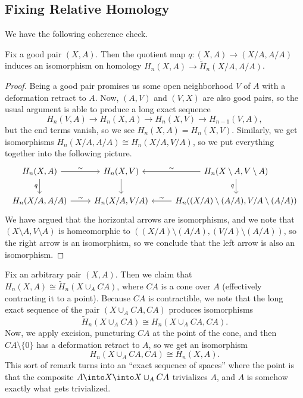 \documentclass[../notes.tex]{subfiles}
\begin{document}
\subsection{Fixing Relative Homology}
We have the following coherence check.
\begin{proposition}
	Fix a good pair $(X,A)$. Then the quotient map $q\colon(X,A)\to (X/A,A/A)$ induces an isomorphism on homology $H_n(X,A)\to\widetilde H_n(X/A,A/A)$.
\end{proposition}
\begin{proof}
	Being a good pair promises us some open neighborhood $V$ of $A$ with a deformation retract to $A$. Now, $(A,V)$ and $(V,X)$ are also good pairs, so the usual argument is able to produce a long exact sequence
	\[H_n(V,A)\to H_n(X,A)\to H_n(X,V)\to H_{n-1}(V,A),\]
	but the end terms vanish, so we see $H_n(X,A)=H_n(X,V)$. Similarly, we get isomorphisms $H_n(X/A,A/A)\cong H_n(X/A,V/A)$, so we put everything together into the following picture.
	\[\begin{tikzcd}
		{H_n(X,A)} & {H_n(X,V)} & {H_n(X\setminus A,V\setminus A)} \\
		{H_n(X/A,A/A)} & {H_n(X/A,V/A)} & {H_n((X/A)\setminus (A/A),V/A\setminus (A/A))}
		\arrow["\sim", from=1-1, to=1-2]
		\arrow["\sim", from=2-1, to=2-2]
		\arrow["\sim"', from=1-3, to=1-2]
		\arrow["\sim"', from=2-3, to=2-2]
		\arrow["q"', from=1-1, to=2-1]
		\arrow[from=1-2, to=2-2]
		\arrow["q"', from=1-3, to=2-3]
	\end{tikzcd}\]
	We have argued that the horizontal arrows are isomorphisms, and we note that $(X\setminus A,V\setminus A)$ is homeomorphic to $((X/A)\setminus (A/A),(V/A)\setminus(A/A))$, so the right arrow is an isomorphism, so we conclude that the left arrow is also an isomorphism.
\end{proof}
\begin{remark}
	Fix an arbitrary pair $(X,A)$. Then we claim that $H_n(X,A)\cong\widetilde H_n(X\cup_ACA)$, where $CA$ is a cone over $A$ (effectively contracting it to a point). Because $CA$ is contractible, we note that the long exact sequence of the pair $(X\cup_ACA,CA)$ produces isomorphisms
	\[\widetilde H_n(X\cup_ACA)\cong H_n(X\cup_ACA,CA).\]
	Now, we apply excision, puncturing $CA$ at the point of the cone, and then $CA\setminus\{0\}$ has a deformation retract to $A$, so we get an isomorphism
	\[H_n(X\cup_ACA,CA)\cong H_n(X,A).\]
	This sort of remark turns into an ``exact sequence of spaces'' where the point is that the composite $A\into X\into X\cup_ACA$ trivializes $A$, and $A$ is somehow exactly what gets trivialized.
\end{remark}
\end{document}
